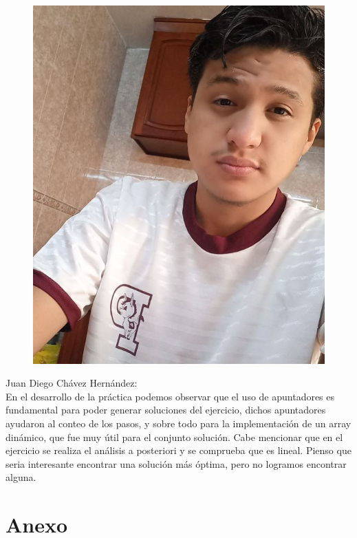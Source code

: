 \documentclass{article}
\begin{document}
    \begin{figure}
        \centering
        \includegraphics[scale=0.2]{diego.jpg}
    \end{figure}
    Juan Diego Chávez Hernández:\\
    En el desarrollo de la práctica podemos observar que el uso de apuntadores es fundamental para poder generar soluciones del ejercicio, dichos apuntadores ayudaron al conteo de los pasos, y sobre todo para la implementación de un array dinámico, que fue muy útil para el conjunto solución. Cabe mencionar que en el ejercicio se realiza el análisis a posteriori y se comprueba que es lineal. Pienso que seria interesante encontrar una solución más óptima, pero no logramos encontrar alguna.\\
    \newpage
    \newpage
\section{Anexo}
\end{document}
